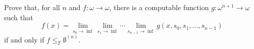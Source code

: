 \begin{problem}
  Prove that, for all $n$ and $f : \omega \to \omega$,
  there is a computable function $g : \omega^{n+1} \to \omega$
  such that
  \[
    f(x) =
      \lim_{s_0 \to \inf}
      \lim_{s_1 \to \inf}
      \cdots
      \lim_{s_{n-1} \to \inf}
      g(x, s_0, s_1, \ldots, s_{n-1})
  \]
  if and only if $f \leq_T \emptyset^{(n)}$.

  \begin{answer}
    






\end{answer}
\end{problem}
